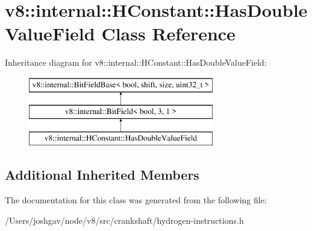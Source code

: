 \hypertarget{classv8_1_1internal_1_1_h_constant_1_1_has_double_value_field}{}\section{v8\+:\+:internal\+:\+:H\+Constant\+:\+:Has\+Double\+Value\+Field Class Reference}
\label{classv8_1_1internal_1_1_h_constant_1_1_has_double_value_field}
Inheritance diagram for v8\+:\+:internal\+:\+:H\+Constant\+:\+:Has\+Double\+Value\+Field\+:\begin{figure}[H]
\begin{center}
\leavevmode
\includegraphics[height=3.000000cm]{classv8_1_1internal_1_1_h_constant_1_1_has_double_value_field}
\end{center}
\end{figure}
\subsection*{Additional Inherited Members}


The documentation for this class was generated from the following file\+:\begin{DoxyCompactItemize}
\item 
/\+Users/joshgav/node/v8/src/crankshaft/hydrogen-\/instructions.\+h\end{DoxyCompactItemize}
